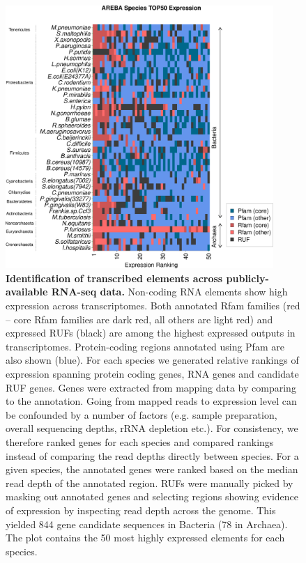 \documentclass[10pt]{article}
\begin{document}
\begin{figure}[!ht]
\begin{center}
\includegraphics[width=4in]{figures/figure1.pdf}
\end{center}
\caption{ {\bf Identification of transcribed elements across
    publicly-available RNA-seq data.} Non-coding RNA elements show
  high expression across transcriptomes. Both annotated Rfam families
  (red – core Rfam families are dark red, all others are light red)
  and expressed RUFs (black) are among the highest expressed outputs
  in transcriptomes. Protein-coding regions annotated using Pfam are
  also shown (blue). For each species we generated relative rankings
  of expression spanning protein coding genes, RNA genes and candidate
  RUF genes. Genes were extracted from mapping data by comparing to
  the annotation. Going from mapped reads to expression level can be
  confounded by a number of factors (e.g. sample preparation, overall
  sequencing depths, rRNA depletion etc.). For consistency, we
  therefore ranked genes for each species and compared rankings
  instead of comparing the read depths directly between species. For a
  given species, the annotated genes were ranked based on the median
  read depth of the annotated region. RUFs were manually picked by
  masking out annotated genes and selecting regions showing evidence
  of expression by inspecting read depth across the genome. This
  yielded 844 gene candidate sequences in Bacteria (78 in
  Archaea). The plot contains the 50 most highly expressed elements
  for each species.}
\label{fig:1}
\end{figure}
\end{document}
